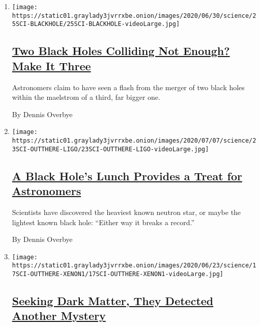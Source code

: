 \begin{enumerate}
\def\labelenumi{\arabic{enumi}.}
\item
  \texttt{[image: https://static01.graylady3jvrrxbe.onion/images/2020/06/30/science/25SCI-BLACKHOLE/25SCI-BLACKHOLE-videoLarge.jpg]}

  \hypertarget{two-black-holes-colliding-not-enough-make-it-three}{%
  \subsection{\texorpdfstring{\href{/2020/06/25/science/black-hole-collision-ligo.html}{Two
  Black Holes Colliding Not Enough? Make It
  Three}}{Two Black Holes Colliding Not Enough? Make It Three}}\label{two-black-holes-colliding-not-enough-make-it-three}}

  Astronomers claim to have seen a flash from the merger of two black
  holes within the maelstrom of a third, far bigger one.

  By Dennis Overbye
\item
  \texttt{[image: https://static01.graylady3jvrrxbe.onion/images/2020/07/07/science/23SCI-OUTTHERE-LIGO/23SCI-OUTTHERE-LIGO-videoLarge.jpg]}

  \hypertarget{a-black-holes-lunch-provides-a-treat-for-astronomers}{%
  \subsection{\texorpdfstring{\href{/2020/06/24/science/black-hole-ligo-gravitational.html}{A
  Black Hole's Lunch Provides a Treat for
  Astronomers}}{A Black Hole's Lunch Provides a Treat for Astronomers}}\label{a-black-holes-lunch-provides-a-treat-for-astronomers}}

  Scientists have discovered the heaviest known neutron star, or maybe
  the lightest known black hole: ``Either way it breaks a record.''

  By Dennis Overbye
\item
  \texttt{[image: https://static01.graylady3jvrrxbe.onion/images/2020/06/23/science/17SCI-OUTTHERE-XENON1/17SCI-OUTTHERE-XENON1-videoLarge.jpg]}

  \hypertarget{seeking-dark-matter-they-detected-another-mystery}{%
  \subsection{\texorpdfstring{\href{/2020/06/17/science/xenon-axions-neutrinos-tritium.html}{Seeking
  Dark Matter, They Detected Another
  Mystery}}{Seeking Dark Matter, They Detected Another Mystery}}\label{seeking-dark-matter-they-detected-another-mystery}}


\end{enumerate}

